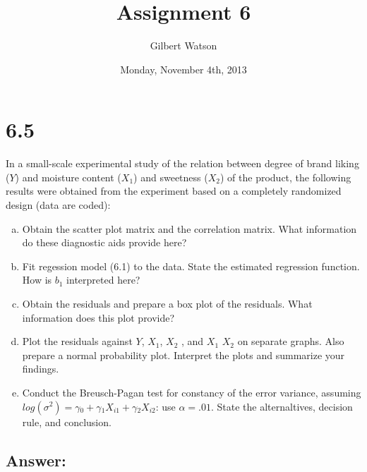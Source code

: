 \documentclass{article}
\begin{document}


\title{Assignment 6}
\author{Gilbert Watson}
\date{Monday, November 4th, 2013}





\maketitle
\tableofcontents

\section{6.5}

In a small-scale experimental study of the relation between degree of brand liking ($Y$) and moisture content ($X_1$) and sweetness ($X_2$) of the product, the following results were obtained from the experiment based on a completely randomized design (data are coded):

\begin{enumerate}[a)]
\item{} Obtain the scatter plot matrix and the correlation matrix. What information do these diagnostic aids provide here?
\item{} Fit regession model (6.1) to the data. State the estimated regression function. How is $b_1$ interpreted here?
\item{} Obtain the residuals and prepare a box plot of the residuals. What information does this plot provide?
\item{} Plot the residuals against $Y$, $X_1$, $X_2$ , and $X_1$ $X_2$ on separate graphs. Also prepare a normal
probability plot. Interpret the plots and summarize your findings.
\item{} Conduct the Breusch-Pagan test for constancy of the error variance, assuming $log(\sigma{}^2) = \gamma{}_0 + \gamma{}_1X_{i1} + \gamma{}_2X_{i2}$: use $\alpha{} = .01$. State the alternaltives, decision rule, and conclusion.
\end{enumerate}

\subsection{Answer:}
\end{document}
